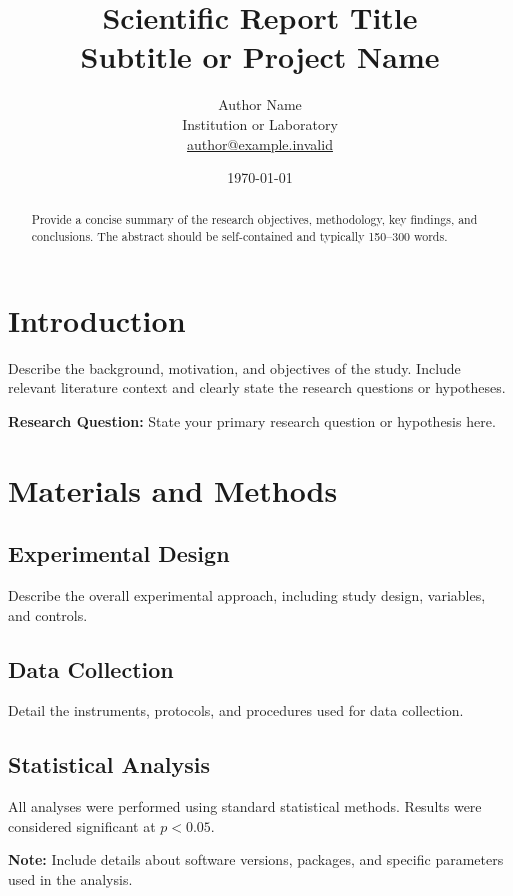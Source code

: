 \documentclass[11pt]{report}
\title{\textbf{Scientific Report Title}\\[0.5em]
\large Subtitle or Project Name}
\author{Author Name\\
\small Institution or Laboratory\\
\small \href{mailto:author@example.invalid}{author@example.invalid}}
\date{\today}
\begin{document}
\maketitle

\begin{abstract}
Provide a concise summary of the research objectives, methodology, key findings, and conclusions. The abstract should be self-contained and typically 150--300 words.
\end{abstract}

\tableofcontents

\chapter{Introduction}

Describe the background, motivation, and objectives of the study. Include relevant literature context and clearly state the research questions or hypotheses.

\begin{highlight}
\textbf{Research Question:} State your primary research question or hypothesis here.
\end{highlight}

\chapter{Materials and Methods}

\section{Experimental Design}

Describe the overall experimental approach, including study design, variables, and controls.

\section{Data Collection}

Detail the instruments, protocols, and procedures used for data collection.

\section{Statistical Analysis}

All analyses were performed using standard statistical methods. Results were considered significant at $p < 0.05$.

\begin{note}
\textbf{Note:} Include details about software versions, packages, and specific parameters used in the analysis.
\end{note}
\end{document}
